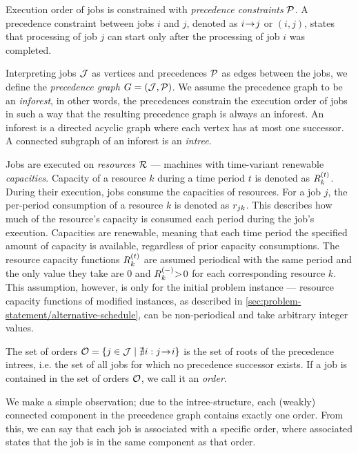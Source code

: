 Execution order of jobs is constrained with \emph{precedence constraints} $\mathcal{P}$.
A precedence constraint between jobs $i$ and $j$, denoted as $i \hspace{-0.2em} \rightarrow \hspace{-0.2em} j$ or $(i, j)$,
states that processing of job $j$ can start only after the processing of job $i$ was completed.

Interpreting jobs $\mathcal{J}$ as vertices and precedences $\mathcal{P}$ as edges between the jobs,
we define the \emph{precedence graph} $G = (\mathcal{J}, \mathcal{P})$.
We assume the precedence graph to be an \emph{inforest}, in other words,
the precedences constrain the execution order of jobs in such a way that the resulting precedence graph
is always an inforest.
An inforest is a directed acyclic graph where each vertex has at most one successor.
A connected subgraph of an inforest is an \emph{intree}.

Jobs are executed on \emph{resources} $\mathcal{R}$ --- machines with time-variant renewable \emph{capacities}.
Capacity of a resource $k$ during a time period $t$ is denoted as $\capacity{k}{t}$.
During their execution, jobs consume the capacities of resources.
For a job $j$, the per-period consumption of a resource $k$ is denoted as $r_{j k}$.
This describes how much of the resource's capacity is consumed each period during the job's execution.
Capacities are renewable, meaning that each time period the specified amount of capacity is available,
regardless of prior capacity consumptions.
The resource capacity functions $\capacity{k}{t}$ are assumed periodical with the same period
and the only value they take are $0$ and $\shiftcapacity{k} \negmedspace>\! 0$ for each corresponding resource $k$.
This assumption, however, is only for the initial problem instance
--- resource capacity functions of modified instances, as described in \cref{sec:problem-statement/alternative-schedule},
can be non-periodical and take arbitrary integer values.

The set of orders $\mathcal{O} = \{ j \in \mathcal{J} \mid \nexists i : j \hspace{-0.2em} \rightarrow \hspace{-0.2em} i \}$
is the set of roots of the precedence intrees,
i.e. the set of all jobs for which no precedence successor exists.
If a job is contained in the set of orders $\mathcal{O}$, we call it an \emph{order}.

We make a simple observation; due to the intree-structure,
each (weakly) connected component in the precedence graph contains exactly one order.
From this, we can say that each job is associated with a specific order,
where associated states that the job is in the same component as that order.

